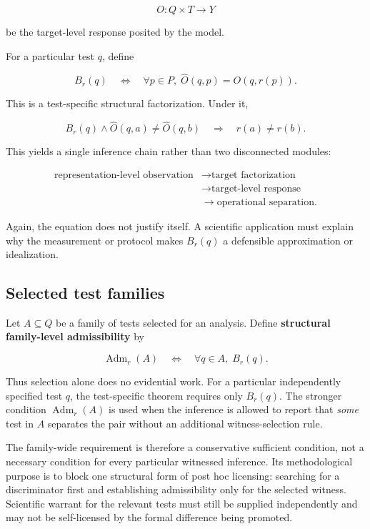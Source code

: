 \documentclass[11pt]{article}
\begin{document}
\[
O:Q\times T\to Y
\]

be the target-level response posited by the model.

For a particular test \(q\), define

\[
B_r(q)
\quad\Longleftrightarrow\quad
\forall p\in P,\;
\widehat O(q,p)=O(q,r(p)).
\]

This is a test-specific structural factorization. Under it,

\[
B_r(q)
\land
\widehat O(q,a)\neq \widehat O(q,b)
\quad\Longrightarrow\quad
r(a)\neq r(b).
\]

This yields a single inference chain rather than two disconnected modules:

\[
\begin{aligned}
\text{representation-level observation}
&\to \text{target factorization}\\
&\to \text{target-level response}\\
&\to \text{operational separation}.
\end{aligned}
\]

Again, the equation does not justify itself. A scientific application must explain why the measurement or protocol makes \(B_r(q)\) a defensible approximation or idealization.

\subsection{Selected test families}

Let \(A\subseteq Q\) be a family of tests selected for an analysis. Define \textbf{structural family-level admissibility} by

\[
\operatorname{Adm}_r(A)
\quad\Longleftrightarrow\quad
\forall q\in A,\;B_r(q).
\]

Thus selection alone does no evidential work. For a particular independently specified test \(q\), the test-specific theorem requires only \(B_r(q)\). The stronger condition \(\operatorname{Adm}_r(A)\) is used when the inference is allowed to report that \emph{some} test in \(A\) separates the pair without an additional witness-selection rule.

The family-wide requirement is therefore a conservative sufficient condition, not a necessary condition for every particular witnessed inference. Its methodological purpose is to block one structural form of post hoc licensing: searching for a discriminator first and establishing admissibility only for the selected witness. Scientific warrant for the relevant tests must still be supplied independently and may not be self-licensed by the formal difference being promoted.
\end{document}
